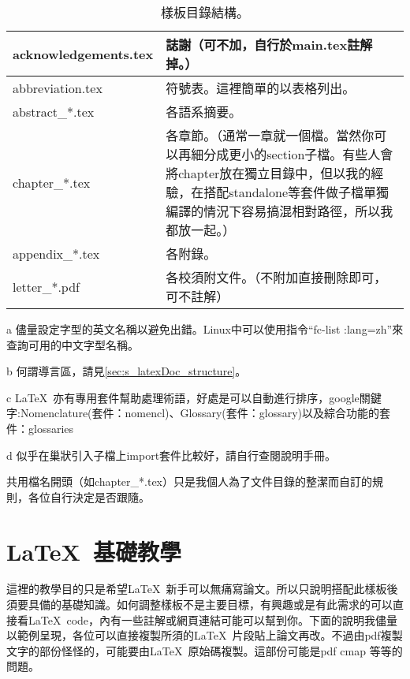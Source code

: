 \documentclass[class=NCU_thesis, crop=false, float=true]{standalone}
\begin{document}
\begin{table}
\begin{threeparttable}
\begin{tabularx}{\textwidth}{| l | X |}
        acknowledgements.tex & 誌謝（可不加，自行於main.tex註解掉。）  \\ \hline
        abbreviation.tex & 符號表。這裡簡單的以表格列出。\tnote{c}  \\ \hline
        abstract\_*.tex & 各語系摘要。  \\ \hline
        chapter\_*.tex & 各章節。（通常一章就一個檔。當然你可以再細分成更小的section子檔。\tnote{d}有些人會將chapter放在獨立目錄中，但以我的經驗，在搭配standalone等套件做子檔單獨編譯的情況下容易搞混相對路徑，所以我都放一起。）  \\ \hline
        appendix\_*.tex & 各附錄。  \\ \hline
        letter\_*.pdf & 各校須附文件。（不附加直接刪除即可，可不註解）  \\ \hline
    \end{tabularx}
    
    \caption{樣板目錄結構。}
    \label{tab:template_structure}
    
    \begin{tablenotes}
        \footnotesize
        \item[a]{儘量設定字型的英文名稱以避免出錯。Linux中可以使用指令``fc-list :lang=zh''來查詢可用的中文字型名稱。}
        \item[b] 何謂導言區，請見\cref{sec:s_latexDoc_structure}。
        \item[c] \LaTeX\ 亦有專用套件幫助處理術語，好處是可以自動進行排序，google關鍵字:Nomenclature(套件：nomencl)、Glossary(套件：glossary)以及綜合功能的套件：glossaries
        \item[d] 似乎在巢狀引入子檔上import套件比較好，請自行查閱說明手冊。
    \end{tablenotes}
    \end{threeparttable}
\end{table}
共用檔名開頭（如chapter\_*.tex）只是我個人為了文件目錄的整潔而自訂的規則，各位自行決定是否跟隨。

\chapter{\LaTeX\ 基礎教學}
\label{sec:c_basicLatex}
這裡的教學目的只是希望\LaTeX\ 新手可以無痛寫論文。所以只說明搭配此樣板後須要具備的基礎知識。如何調整樣板不是主要目標，有興趣或是有此需求的可以直接看\LaTeX\  code，內有一些註解或網頁連結可能可以幫到你。下面的說明我儘量以範例呈現，各位可以直接複製所須的\LaTeX\ 片段貼上論文再改。不過由pdf複製文字的部份怪怪的，可能要由\LaTeX\  原始碼複製。這部份可能是pdf cmap 等等的問題。
\end{document}
